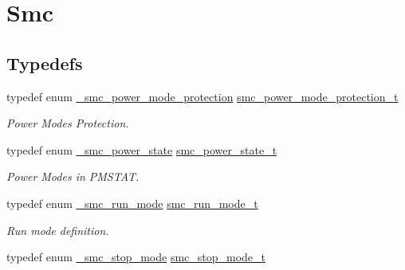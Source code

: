 \hypertarget{group__smc}{}\section{Smc}
\label{group__smc}
\subsection*{Typedefs}
\begin{DoxyCompactItemize}
\item 
\mbox{\label{group__smc_gae7c2937e0ea1e285d082aa300f98b13c}} 
typedef enum \mbox{\hyperlink{group__smc_ga53fe305f7c8245eb9faac439fc4d5051}{\+\_\+smc\+\_\+power\+\_\+mode\+\_\+protection}} \mbox{\hyperlink{group__smc_gae7c2937e0ea1e285d082aa300f98b13c}{smc\+\_\+power\+\_\+mode\+\_\+protection\+\_\+t}}
\begin{DoxyCompactList}\small\item\em Power Modes Protection. \end{DoxyCompactList}\item 
\mbox{\label{group__smc_ga1a2eebdb1e5516b543c27e68d61f8b85}} 
typedef enum \mbox{\hyperlink{group__smc_gac5330d1b90932ef578e4e0d06b2f5ae5}{\+\_\+smc\+\_\+power\+\_\+state}} \mbox{\hyperlink{group__smc_ga1a2eebdb1e5516b543c27e68d61f8b85}{smc\+\_\+power\+\_\+state\+\_\+t}}
\begin{DoxyCompactList}\small\item\em Power Modes in P\+M\+S\+T\+AT. \end{DoxyCompactList}\item 
\mbox{\label{group__smc_ga861334db15972df1faebfec3992bf211}} 
typedef enum \mbox{\hyperlink{group__smc_gac2c182287ebbb6119d8bcbb6ead71e53}{\+\_\+smc\+\_\+run\+\_\+mode}} \mbox{\hyperlink{group__smc_ga861334db15972df1faebfec3992bf211}{smc\+\_\+run\+\_\+mode\+\_\+t}}
\begin{DoxyCompactList}\small\item\em Run mode definition. \end{DoxyCompactList}\item 
\mbox{\label{group__smc_ga2fdba7a72fb477e8b4515b3a52055291}} 
typedef enum \mbox{\hyperlink{group__smc_ga107d1c64902b4a1a0270a51008b854d5}{\+\_\+smc\+\_\+stop\+\_\+mode}} \mbox{\hyperlink{group__smc_ga2fdba7a72fb477e8b4515b3a52055291}{smc\+\_\+stop\+\_\+mode\+\_\+t}}

\end{DoxyCompactItemize}
